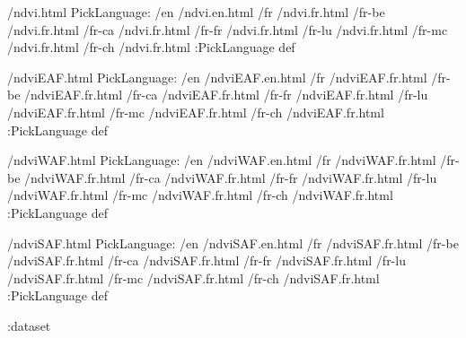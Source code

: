 \begin{ingrid}
/ndvi.html {
PickLanguage:
/en /ndvi.en.html
/fr /ndvi.fr.html
/fr-be /ndvi.fr.html
/fr-ca /ndvi.fr.html
/fr-fr /ndvi.fr.html
/fr-lu /ndvi.fr.html
/fr-mc /ndvi.fr.html
/fr-ch /ndvi.fr.html
:PickLanguage
} def

/ndviEAF.html {
PickLanguage:
/en /ndviEAF.en.html
/fr /ndviEAF.fr.html
/fr-be /ndviEAF.fr.html
/fr-ca /ndviEAF.fr.html
/fr-fr /ndviEAF.fr.html
/fr-lu /ndviEAF.fr.html
/fr-mc /ndviEAF.fr.html
/fr-ch /ndviEAF.fr.html
:PickLanguage
} def

/ndviWAF.html {
PickLanguage:
/en /ndviWAF.en.html
/fr /ndviWAF.fr.html
/fr-be /ndviWAF.fr.html
/fr-ca /ndviWAF.fr.html
/fr-fr /ndviWAF.fr.html
/fr-lu /ndviWAF.fr.html
/fr-mc /ndviWAF.fr.html
/fr-ch /ndviWAF.fr.html
:PickLanguage
} def

/ndviSAF.html {
PickLanguage:
/en /ndviSAF.en.html
/fr /ndviSAF.fr.html
/fr-be /ndviSAF.fr.html
/fr-ca /ndviSAF.fr.html
/fr-fr /ndviSAF.fr.html
/fr-lu /ndviSAF.fr.html
/fr-mc /ndviSAF.fr.html
/fr-ch /ndviSAF.fr.html
:PickLanguage
} def

:dataset
\end{ingrid}
